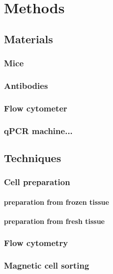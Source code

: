 
\chapter{Methods}

\section{Materials}
\subsection{Mice}
\subsection{Antibodies}
\subsection{Flow cytometer}
\subsection{qPCR machine...}

\section{Techniques}
\subsection{Cell preparation}
\subsubsection{preparation from frozen tissue}
\subsubsection{preparation from fresh tissue}

\subsection{Flow cytometry}

\subsection{Magnetic cell sorting}
